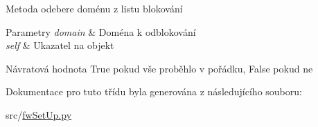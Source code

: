 Metoda odebere doménu z listu blokování 


\begin{DoxyParams}{Parametry}
{\em domain} & Doména k odblokování \\
\hline
{\em self} & Ukazatel na objekt \\
\hline
\end{DoxyParams}
\begin{DoxyReturn}{Návratová hodnota}
True pokud vše proběhlo v pořádku, False pokud ne 
\end{DoxyReturn}


Dokumentace pro tuto třídu byla generována z následujícího souboru\-:\begin{DoxyCompactItemize}
\item 
src/\hyperlink{fwSetUp_8py}{fw\-Set\-Up.\-py}\end{DoxyCompactItemize}
